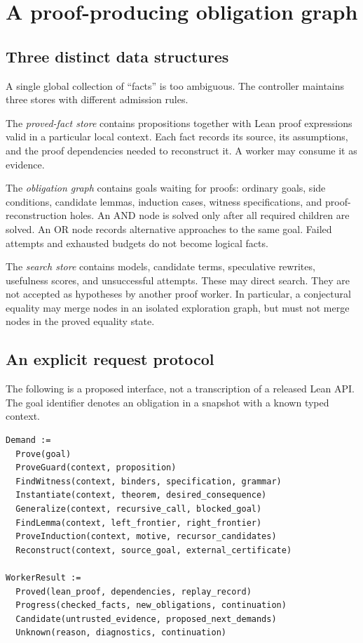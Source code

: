 \section{A proof-producing obligation graph}

\subsection{Three distinct data structures}

A single global collection of ``facts'' is too ambiguous. The controller
maintains three stores with different admission rules.

The \emph{proved-fact store} contains propositions together with Lean proof
expressions valid in a particular local context. Each fact records its source,
its assumptions, and the proof dependencies needed to reconstruct it. A
worker may consume it as evidence.

The \emph{obligation graph} contains goals waiting for proofs: ordinary goals,
side conditions, candidate lemmas, induction cases, witness specifications,
and proof-reconstruction holes. An AND node is solved only after all required
children are solved. An OR node records alternative approaches to the same
goal. Failed attempts and exhausted budgets do not become logical facts.

The \emph{search store} contains models, candidate terms, speculative
rewrites, usefulness scores, and unsuccessful attempts. These may direct
search. They are not accepted as hypotheses by another proof worker. In
particular, a conjectural equality may merge nodes in an isolated exploration
graph, but must not merge nodes in the proved equality state.

\subsection{An explicit request protocol}

The following is a proposed interface, not a transcription of a released Lean
API. The goal identifier denotes an obligation in a snapshot with a known
typed context.

\begin{lstlisting}
Demand :=
  Prove(goal)
  ProveGuard(context, proposition)
  FindWitness(context, binders, specification, grammar)
  Instantiate(context, theorem, desired_consequence)
  Generalize(context, recursive_call, blocked_goal)
  FindLemma(context, left_frontier, right_frontier)
  ProveInduction(context, motive, recursor_candidates)
  Reconstruct(context, source_goal, external_certificate)

WorkerResult :=
  Proved(lean_proof, dependencies, replay_record)
  Progress(checked_facts, new_obligations, continuation)
  Candidate(untrusted_evidence, proposed_next_demands)
  Unknown(reason, diagnostics, continuation)
\end{lstlisting}

